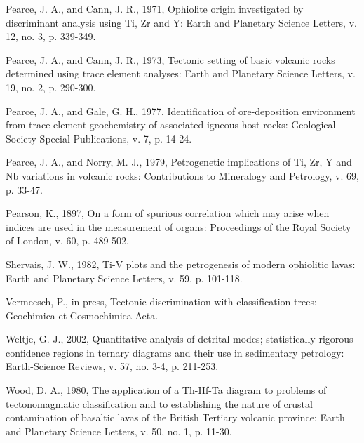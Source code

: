 \documentclass{article}
\begin{document}
\begin{description}
\item Pearce, J. A., and Cann, J. R., 1971, Ophiolite origin investigated by
discriminant analysis using Ti, Zr  and Y: Earth and Planetary Science
Letters, v. 12, no. 3, p. 339-349.

\item Pearce,  J. A.,  and  Cann, J.  R.,  1973, Tectonic  setting of  basic
volcanic  rocks determined  using  trace element  analyses: Earth  and
Planetary Science Letters, v. 19, no. 2, p. 290-300.

\item  Pearce,  J.  A.,  and  Gale, G.  H.,  1977,  Identification  of
ore-deposition   environment  from   trace  element   geochemistry  of
associated   igneous   host    rocks:   Geological   Society   Special
Publications, v. 7, p. 14-24.

\item Pearce, J. A., and Norry, M. J., 1979, Petrogenetic implications
of Ti,  Zr, Y  and Nb variations  in volcanic rocks:  Contributions to
Mineralogy and Petrology, v. 69, p. 33-47.

\item Pearson, K.,  1897, On a form of  spurious correlation which may
arise when indices are used  in the measurement of organs: Proceedings
of the Royal Society of London, v. 60, p. 489-502.

\item Shervais, J. W., 1982, Ti-V plots and the petrogenesis of modern
ophiolitic  lavas:  Earth  and   Planetary  Science  Letters,  v.  59,
p. 101-118.

\item   Vermeesch,  P.,   in  press,   Tectonic   discrimination  with
classification trees: Geochimica et Cosmochimica Acta.

\item Weltje,  G. J., 2002,  Quantitative analysis of  detrital modes;
statistically  rigorous  confidence regions  in  ternary diagrams  and
their  use in  sedimentary  petrology: Earth-Science  Reviews, v.  57,
no. 3-4, p. 211-253.

\item  Wood, D. A.,  1980, The  application of  a Th-Hf-Ta  diagram to
problems  of tectonomagmatic  classification and  to  establishing the
nature  of crustal  contamination  of basaltic  lavas  of the  British
Tertiary  volcanic  province:  Earth  and Planetary  Science  Letters,
v. 50, no. 1, p. 11-30.

\end{description}

\singlespace

\clearpage
\listoftables

\clearpage


\clearpage
\listoffigures

\clearpage

\end{document}
